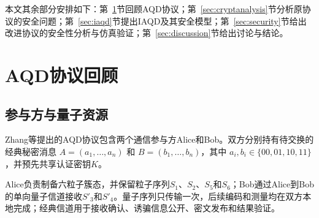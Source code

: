 \documentclass[UTF8,10pt,a4paper]{ctexart}
\theoremstyle{aqdplain}
\begin{document}
本文其余部分安排如下：第~\ref{sec:review}节回顾AQD协议；第~\ref{sec:cryptanalysis}节分析原协议的安全问题；第~\ref{sec:iaqd}节提出IAQD及其安全模型；第~\ref{sec:security}节给出改进协议的安全性分析与仿真验证；第~\ref{sec:discussion}节给出讨论与结论。

\section{AQD协议回顾}
\label{sec:review}

\subsection{参与方与量子资源}

Zhang等提出的AQD协议\citep{zhang2025aqd}包含两个通信参与方Alice和Bob。双方分别持有待交换的经典秘密消息
$A=(a_1,\ldots,a_n)$ 和 $B=(b_1,\ldots,b_n)$，其中
$a_i,b_i\in\{00,01,10,11\}$，并预先共享认证密钥$K$。

Alice负责制备六粒子簇态，并保留粒子序列$S_1$、$S_2$、$S_5$和$S_6$；Bob通过Alice到Bob的单向量子信道接收$S'_3$和$S'_4$。量子序列只传输一次，后续编码和测量均在双方本地完成；经典信道用于接收确认、诱骗信息公开、密文发布和结果验证。
\end{document}
